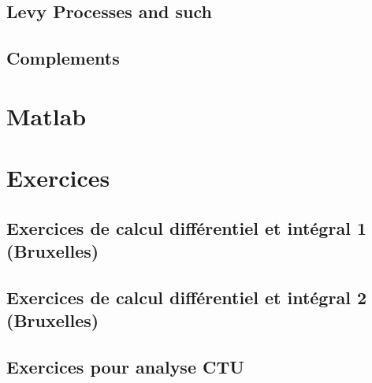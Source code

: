 \documentclass[a4paper,twoside,11pt]{book}
\begin{document}
\chapter{Levy Processes and such}


\chapter{Complements}









\emptyInputPath
{}

\part{Matlab}




\emptyInputPath
{}
\part{Exercices}





\chapter{Exercices de calcul différentiel et intégral 1 (Bruxelles)}



\chapter{Exercices de calcul différentiel et intégral 2 (Bruxelles)}




\chapter{Exercices pour analyse CTU}


{
}



\emptyInputPath
{}

\end{document}
